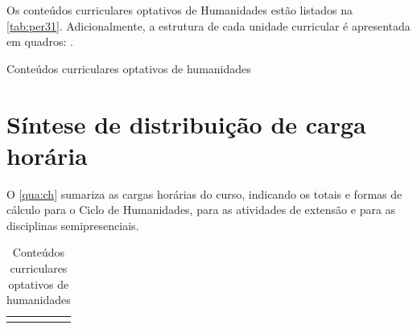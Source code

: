 Os conteúdos curriculares optativos de Humanidades estão listados na \autoref{tab:per31}. Adicionalmente, a estrutura de cada unidade curricular é apresentada em quadros: .

\begin{table}[!htb]
	\centering\footnotesize
	\caption{Conteúdos curriculares optativos de humanidades}
	\label{tab:per31}
\end{table}

\clearpage


\section{Síntese de distribuição de carga horária}

O \autoref{qua:ch} sumariza as cargas horárias do curso, indicando os totais e formas de cálculo para o Ciclo de Humanidades, para as atividades de extensão e para as disciplinas semipresenciais.

\begin{table}[!htb]
	\centering
	\caption{Conteúdos curriculares optativos de humanidades}
	\label{qua:ch}
	\begin{tabularx}{\textwidth}{>{\centering\arraybackslash}X >{\centering\arraybackslash}X} \toprule
		\multicolumn{2}{c}{\bfseries Carga Horária Total do Curso} 
		
	\end{tabularx}
\end{table}